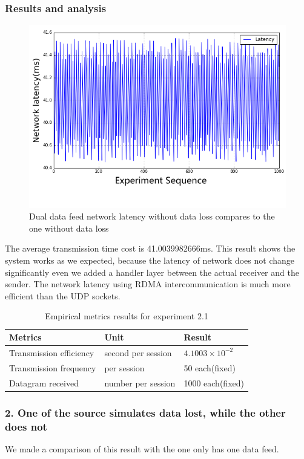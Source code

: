 \documentclass[11pt,openright,a4paper]{report}
\begin{document}
\subsubsection{Results and analysis}
\begin{figure}[H]
\centering
\includegraphics[width=0.7\linewidth]{picture/experiments/exp2/dualLatency}
\caption{Dual data feed network latency without data loss compares to the one without data loss}
\label{fig:dualLatency}
\end{figure}
The average transmission time cost is 41.0039982666ms. This result shows the system works as we expected, because the latency of network does not change significantly even we added a handler layer between the actual receiver and the sender. The network latency using RDMA intercommunication is much more efficient than the UDP sockets.\\ 
\begin{table}[H]
	\centering
	\caption{Empirical metrics results for experiment 2.1}
	\label{my-label}
	\begin{tabular}{@{}lll@{}}
		\toprule
		Metrics                 & Unit               & Result                 \\ \midrule
		Transmission efficiency & second per session & $4.1003\times 10^{-2}$ \\
		Transmission frequency  & per session        & 50 each(fixed)              \\
		Datagram received       & number per session & 1000 each(fixed)            \\ \bottomrule
	\end{tabular}
\end{table}
\subsubsection{2. One of the source simulates data lost, while the other does not}
We made a comparison of this result with the one only has one data feed. 
\end{document}
